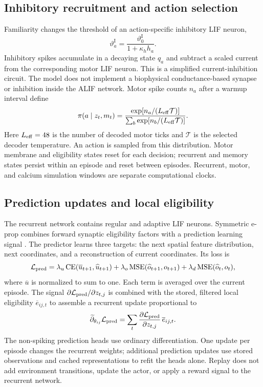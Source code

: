 \subsection{Inhibitory recruitment and action selection}
Familiarity changes the threshold of an action-specific inhibitory LIF neuron,
\begin{equation}
 \vartheta^{\mathrm I}_a=\frac{\vartheta^{\mathrm I}_0}{1+\kappa_h h_a}.
\end{equation}
Inhibitory spikes accumulate in a decaying state $q_a$ and subtract a scaled current from the corresponding motor LIF neuron. This is a simplified current-inhibition circuit. The model does not implement a biophysical conductance-based synapse or inhibition inside the ALIF network. Motor spike counts $n_a$ after a warmup interval define
\begin{equation}
 \pi(a\mid z_t,m_t)=
 \frac{\exp[n_a/(L_{\rm eff}\mathcal T)]}{\sum_b\exp[n_b/(L_{\rm eff}\mathcal T)]}.
\end{equation}
Here $L_{\rm eff}=48$ is the number of decoded motor ticks and $\mathcal T$ is the selected decoder temperature. An action is sampled from this distribution. Motor membrane and eligibility states reset for each decision; recurrent and memory states persist within an episode and reset between episodes. Recurrent, motor, and calcium simulation windows are separate computational clocks.

\subsection{Prediction updates and local eligibility}
The recurrent network contains regular and adaptive LIF neurons. Symmetric e-prop combines forward synaptic eligibility factors with a prediction learning signal \cite{bellec2020}. The predictor learns three targets: the next spatial feature distribution, next coordinates, and a reconstruction of current coordinates. Its loss is
\begin{equation}
 \mathcal L_{\rm pred}=\lambda_u\operatorname{CE}(\overline u_{t+1},\widehat u_{t+1})
 +\lambda_o\operatorname{MSE}(\widehat o_{t+1},o_{t+1})
 +\lambda_d\operatorname{MSE}(\widehat o_t,o_t),
\end{equation}
where $\overline u$ is normalized to sum to one. Each term is averaged over the current episode. The signal $\partial\mathcal L_{\rm pred}/\partial z_{t,j}$ is combined with the stored, filtered local eligibility $\overline e_{ij,t}$ to assemble a recurrent update proportional to
\begin{equation}
 \widetilde{\partial}_{\theta_{ij}}\mathcal L_{\rm pred}
 =\sum_t\frac{\partial\mathcal L_{\rm pred}}{\partial z_{t,j}}\,\overline e_{ij,t}.
\end{equation}
The non-spiking prediction heads use ordinary differentiation. One update per episode changes the recurrent weights; additional prediction updates use stored observations and cached representations to refit the heads alone. Replay does not add environment transitions, update the actor, or apply a reward signal to the recurrent network.

